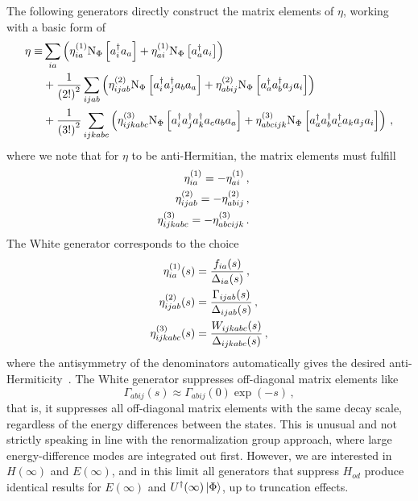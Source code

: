 The following generators directly construct the matrix elements of $\eta$, working with a basic form of
\begin{equation}
  \begin{split}
    \eta \equiv & \sum_{ia}\left(\eta^{(1)}_{ia} \text{N}_{\Phi}\left[a_{i}^{\dagger}a_{a}\right]
    + \eta^{(1)}_{ai} \text{N}_{\Phi}\left[a_{a}^{\dagger}a_{i}\right]\right) \\
    & + \frac{1}{{(2!)}^2} \sum_{ijab} \left(
    \eta^{(2)}_{ijab} \text{N}_{\Phi}\left[a_{i}^{\dagger}a_{j}^{\dagger}a_{b}a_{a}\right]
    + \eta^{(2)}_{abij} \text{N}_{\Phi}\left[a_{a}^{\dagger}a_{b}^{\dagger}a_{j}a_{i}\right]
    \right) \\
    & + \frac{1}{{(3!)}^2} \sum_{ijkabc} \left(
    \eta^{(3)}_{ijkabc} \text{N}_{\Phi}\left[a_{i}^{\dagger}a_{j}^{\dagger}a_{k}^{\dagger}a_{c}a_{b}a_{a}\right]
    + \eta^{(3)}_{abcijk} \text{N}_{\Phi}\left[a_{a}^{\dagger}a_{b}^{\dagger}a_{c}^{\dagger}a_{k}a_{j}a_{i}\right]
    \right)\,,
  \end{split}
\end{equation}
where we note that for $\eta$ to be anti-Hermitian, the matrix elements must fulfill
\begin{subequations}
  \begin{align}
    \begin{split}
      \eta^{(1)}_{ia} &= - \eta^{(1)}_{ai}\,,
    \end{split} \\
    \begin{split}
      \eta^{(2)}_{ijab} &= - \eta^{(2)}_{abij}\,,
    \end{split} \\
    \begin{split}
      \eta^{(3)}_{ijkabc} &= - \eta^{(3)}_{abcijk}\,.
    \end{split}
  \end{align}
\end{subequations}
The White generator corresponds to the choice
\begin{align}
  \eta^{(1)}_{ia}(s)       & = \frac{f_{ia}(s)}{\Delta_{ia}(s)}\,,          \\
  \eta^{(2)}_{ijab}(s)     & = \frac{\Gamma_{ijab}(s)}{\Delta_{ijab}(s)}\,, \\
  \eta^{(3)}_{ijkabc}(s) & = \frac{W_{ijkabc}(s)}{\Delta_{ijkabc}(s)}\,,
\end{align}
where the antisymmetry of the denominators automatically gives the desired anti-Hermiticity~\cite{Whit02generator}.
The White generator suppresses off-diagonal matrix elements like
\begin{equation}
  \Gamma_{abij}(s) \approx \Gamma_{abij}(0) \exp(-s)\,,
\end{equation}
that is, it suppresses all off-diagonal matrix elements with the same decay scale,
regardless of the energy differences between the states.
This is unusual and not strictly speaking in line with the renormalization group approach,
where large energy-difference modes are integrated out first.
However, we are interested in $H(\infty)$ and $E(\infty)$,
and in this limit all generators that suppress $H_{od}$ produce identical results
for $E(\infty)$ and $U^{\dagger}(\infty)\ket{\Phi}$,
up to truncation effects.


